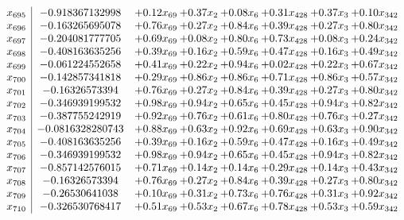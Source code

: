 \documentclass[8pt]{article}
\begin{document}
\[\begin{array}{c| c c@{\hskip 2pt} c@{\hskip 2pt} c@{\hskip 2pt} c@{\hskip 2pt} c@{\hskip 2pt} c@{\hskip 2pt} }
 x_{695}   &  -0.918367132998 & +  0.12 x_{69} & +  0.37 x_{2} & +  0.08 x_{6} & +  0.31 x_{428} & +  0.37 x_{3} & +  0.10 x_{342}\\
 x_{696}   &  -0.163265695078 & +  0.76 x_{69} & +  0.27 x_{2} & +  0.84 x_{6} & +  0.39 x_{428} & +  0.27 x_{3} & +  0.80 x_{342}\\
 x_{697}   &  -0.204081777705 & +  0.69 x_{69} & +  0.08 x_{2} & +  0.80 x_{6} & +  0.73 x_{428} & +  0.08 x_{3} & +  0.24 x_{342}\\
 x_{698}   &  -0.408163635256 & +  0.39 x_{69} & +  0.16 x_{2} & +  0.59 x_{6} & +  0.47 x_{428} & +  0.16 x_{3} & +  0.49 x_{342}\\
 x_{699}   &  -0.061224552658 & +  0.41 x_{69} & +  0.22 x_{2} & +  0.94 x_{6} & +  0.02 x_{428} & +  0.22 x_{3} & +  0.67 x_{342}\\
 x_{700}   &  -0.142857341818 & +  0.29 x_{69} & +  0.86 x_{2} & +  0.86 x_{6} & +  0.71 x_{428} & +  0.86 x_{3} & +  0.57 x_{342}\\
 x_{701}   &  -0.16326573394 & +  0.76 x_{69} & +  0.27 x_{2} & +  0.84 x_{6} & +  0.39 x_{428} & +  0.27 x_{3} & +  0.80 x_{342}\\
 x_{702}   &  -0.346939199532 & +  0.98 x_{69} & +  0.94 x_{2} & +  0.65 x_{6} & +  0.45 x_{428} & +  0.94 x_{3} & +  0.82 x_{342}\\
 x_{703}   &  -0.387755242919 & +  0.92 x_{69} & +  0.76 x_{2} & +  0.61 x_{6} & +  0.80 x_{428} & +  0.76 x_{3} & +  0.27 x_{342}\\
 x_{704}   &  -0.0816328280743 & +  0.88 x_{69} & +  0.63 x_{2} & +  0.92 x_{6} & +  0.69 x_{428} & +  0.63 x_{3} & +  0.90 x_{342}\\
 x_{705}   &  -0.408163635256 & +  0.39 x_{69} & +  0.16 x_{2} & +  0.59 x_{6} & +  0.47 x_{428} & +  0.16 x_{3} & +  0.49 x_{342}\\
 x_{706}   &  -0.346939199532 & +  0.98 x_{69} & +  0.94 x_{2} & +  0.65 x_{6} & +  0.45 x_{428} & +  0.94 x_{3} & +  0.82 x_{342}\\
 x_{707}   &  -0.857142576015 & +  0.71 x_{69} & +  0.14 x_{2} & +  0.14 x_{6} & +  0.29 x_{428} & +  0.14 x_{3} & +  0.43 x_{342}\\
 x_{708}   &  -0.16326573394 & +  0.76 x_{69} & +  0.27 x_{2} & +  0.84 x_{6} & +  0.39 x_{428} & +  0.27 x_{3} & +  0.80 x_{342}\\
 x_{709}   &  -0.26530641038 & +  0.10 x_{69} & +  0.31 x_{2} & +  0.73 x_{6} & +  0.76 x_{428} & +  0.31 x_{3} & +  0.92 x_{342}\\
 x_{710}   &  -0.326530768417 & +  0.51 x_{69} & +  0.53 x_{2} & +  0.67 x_{6} & +  0.78 x_{428} & +  0.53 x_{3} & +  0.59 x_{342}\\

\end{array}\]
\end{document}
